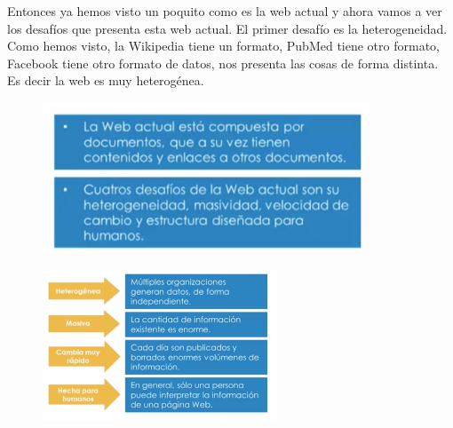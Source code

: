 
Entonces ya hemos visto un poquito como es la web actual y ahora vamos a ver los desafíos que presenta esta web actual. El primer desafío es la heterogeneidad. Como hemos visto, la Wikipedia tiene un formato, PubMed tiene otro formato, Facebook tiene otro formato de datos, nos presenta las cosas de forma distinta. Es decir la web es muy heterogénea.

\begin{figure}[H]
	\centering
	\includegraphics[height=4.5cm]{imagenes/capitulo3/3} %
	\caption{}
\end{figure}

\begin{figure}[H]
	\centering
	\includegraphics[height=4.5cm]{imagenes/capitulo3/1} %
	\caption{}
\end{figure}


